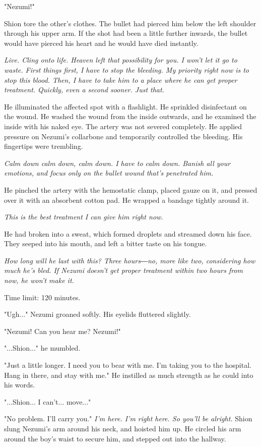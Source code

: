 "Nezumi!"

Shion tore the other's clothes. The bullet had pierced him below the
left shoulder through his upper arm. If the shot had been a little
further inwards, the bullet would have pierced his heart and he would
have died instantly.

\emph{Live. Cling onto life. Heaven left that possibility for you. I won't let
it go to waste. First things first, I have to stop the bleeding. My
priority right now is to stop this blood. Then, I have to take him to a
place where he can get proper treatment. Quickly, even a second sooner.
Just that.}

He illuminated the affected spot with a flashlight. He sprinkled
disinfectant on the wound. He washed the wound from the inside outwards,
and he examined the inside with his naked eye. The artery was not
severed completely. He applied pressure on Nezumi's collarbone and
temporarily controlled the bleeding. His fingertips were trembling.

\emph{Calm down calm down, calm down. I have to calm down. Banish all your
emotions, and focus only on the bullet wound that's penetrated him.}

He pinched the artery with the hemostatic clamp, placed gauze on it, and
pressed over it with an absorbent cotton pad. He wrapped a bandage
tightly around it.

\emph{This is the best treatment I can give him right now.}

He had broken into a sweat, which formed droplets and streamed down his
face. They seeped into his mouth, and left a bitter taste on his tongue.

\emph{How long will he last with this? Three hours―no, more like two,
considering how much he's bled. If Nezumi doesn't get proper treatment
within two hours from now, he won't make it.}

Time limit: 120 minutes.

"Ugh..." Nezumi groaned softly. His eyelids fluttered slightly.

"Nezumi! Can you hear me? Nezumi!"

"...Shion..." he mumbled.

"Just a little longer. I need you to bear with me. I'm taking you to the
hospital. Hang in there, and stay with me." He instilled as much
strength as he could into his words.

"...Shion... I can't... move..."

"No problem. I'll carry you." \emph{I'm here. I'm right here. So you'll be
alright.} Shion slung Nezumi's arm around his neck, and hoisted him up.
He circled his arm around the boy's waist to secure him, and stepped out
into the hallway.

